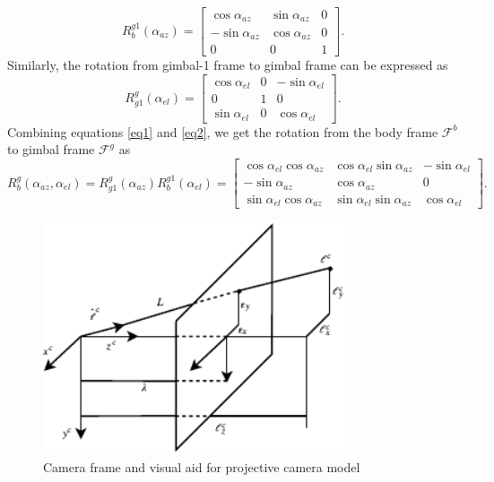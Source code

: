 \begin{equation}
R^{g1}_b(\alpha_{az}) = \begin{bmatrix}
\cos\alpha_{az} & \sin\alpha_{az} & 0 \\
-\sin\alpha_{az} & \cos\alpha_{az} & 0 \\
0 & 0 & 1
\end{bmatrix}.
\label{eq1}
\end{equation}
Similarly, the rotation from gimbal-1 frame to gimbal frame can be expressed as 
\begin{equation}
R^g_{g1}(\alpha_{el})
= \begin{bmatrix}
\cos\alpha_{el} &  0 & -\sin\alpha_{el}\\
0 & 1 & 0 \\
\sin\alpha_{el} & 0 & \cos\alpha_{el}
\end{bmatrix}.
\label{eq2}
\end{equation}
Combining equations \ref{eq1} and \ref{eq2}, we get the rotation from the body frame $\mathcal{F}^b$ to gimbal frame $\mathcal{F}^{g}$ as
\begin{equation}
R^{g}_b(\alpha_{az}, \alpha_{el}) = R^g_{g1}(\alpha_{az})R^{g1}_b(\alpha_{el}) =
\begin{bmatrix}
\cos\alpha_{el}\cos\alpha_{az} & \cos\alpha_{el}\sin\alpha_{az} & -\sin\alpha_{el} \\
-\sin\alpha_{az} & \cos\alpha_{az} & 0 \\
\sin\alpha_{el}\cos\alpha_{az} & \sin\alpha_{el}\sin\alpha_{az} & \cos\alpha_{el}
\end{bmatrix}.
\label{eq3}
\end{equation}

\begin{figure}[htbp]
	\centering
	\includegraphics[width = 3.5in]{images/chapter2/camera_frame}
	\caption{Camera frame and visual aid for projective camera model}
	\label{camera_frame}
\end{figure}

